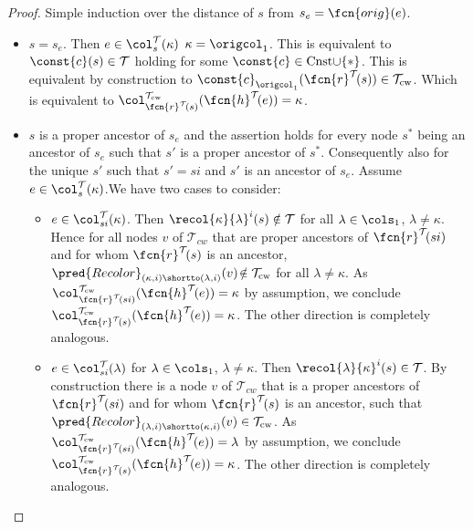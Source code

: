 \begin{proof}
	Simple induction over the distance of $s$ from $s_e = \fcn{orig}(e)$.
	\begin{itemize}
		\item $s = s_e$. Then $e\in\col_s^{\mathcal{T}}(\kappa)$ \iffi $\kappa = \origcol_1$. This is equivalent to $\const{c}(s)\in\mathcal{T}$ holding for some $\const{c}\in\mathrm{Cnst}{\cup}\{ \ast \}$. This is equivalent by construction to $\const{c}_{\origcol_1}(\fcn{r}^{\mathcal{T}}\!(s))\in\mathcal{T}_{\mathrm{cw}}$. Which is equivalent to $\col_{\fcn{r}^{\mathcal{T}}\!(s)}^{\mathcal{T}_{\mathrm{cw}}}(\fcn{h}^{\mathcal{T}}\!(e)) = \kappa$. 
		\item $s$ is a proper ancestor of $s_e$ and the assertion holds for every node $s^{\ast}$ being an ancestor of $s_e$ such that $s'$ is a proper ancestor of $s^{\ast}$. Consequently also for the unique $s'$ such that $s'= si $ and $s'$ is an ancestor of $s_e$. 
		Assume $e\in\col_{s}^{\mathcal{T}}(\kappa)$.We have two cases to consider:
		\begin{itemize}
			\item $e\in\col_{si}^{\mathcal{T}}(\kappa)$. Then $\recol{\kappa}{\lambda}^{i}(s)\notin\mathcal{T}$ for all $\lambda\in\cols_1$, $\lambda\neq\kappa$. Hence for all nodes $v$ of $\mathcal{T}_{cw}$ that are proper ancestors of $\fcn{r}^{\mathcal{T}}\!(si)$ and for whom $\fcn{r}^{\mathcal{T}}\!(s)$ is an ancestor, $\pred{Recolor}_{(\kappa, i)\shortto(\lambda, i)}(v)\!\notin\mathcal{T}_{\mathrm{cw}}$ for all $\lambda\neq \kappa$. As $\col_{\fcn{r}^{\mathcal{T}}\!(si)}^{\mathcal{T}_{\mathrm{cw}}}(\fcn{h}^{\mathcal{T}}\!(e)) = \kappa$ by assumption, we conclude $\col_{\fcn{r}^{\mathcal{T}}\!(s)}^{\mathcal{T}_{\mathrm{cw}}}(\fcn{h}^{\mathcal{T}}\!(e)) = \kappa$. The other direction is completely analogous.
			\item $e\in\col_{si}^{\mathcal{T}}(\lambda)$ for $\lambda\in\cols_1$, $\lambda\neq\kappa$. Then $\recol{\lambda}{\kappa}^{i}(s)\in\mathcal{T}$. By construction  there is a node $v$ of $\mathcal{T}_{cw}$ that is a proper ancestors of $\fcn{r}^{\mathcal{T}}\!(si)$ and for whom $\fcn{r}^{\mathcal{T}}\!(s)$ is an ancestor, such that $\pred{Recolor}_{(\lambda, i)\shortto(\kappa, i)}(v)\in\mathcal{T}_{\mathrm{cw}}$. As $\col_{\fcn{r}^{\mathcal{T}}\!(si)}^{\mathcal{T}_{\mathrm{cw}}}(\fcn{h}^{\mathcal{T}}\!(e)) = \lambda$ by assumption, we conclude $\col_{\fcn{r}^{\mathcal{T}}\!(s)}^{\mathcal{T}_{\mathrm{cw}}}(\fcn{h}^{\mathcal{T}}\!(e)) = \kappa$. The other direction is completely analogous. \qedhere
		\end{itemize}
	\end{itemize}
\end{proof}

